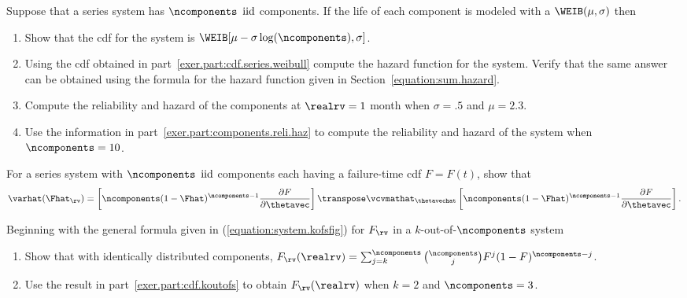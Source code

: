 \begin{exercise1}
Suppose that a series system has $\ncomponents$
$\rm{iid}$ components. If the life of each component
is modeled with a $\WEIB(\mu, \sigma)$ then
\begin{enumerate}
\item
\label{exer.part:cdf.series.weibull}
Show that the cdf for the
system is $\WEIB[\mu-\sigma \log(\ncomponents), \sigma]$.
\item
Using the cdf obtained in part~\ref{exer.part:cdf.series.weibull}
compute the hazard function for the system. Verify that
the same answer can be obtained using the formula 
for the hazard function given in Section~\ref{equation:sum.hazard}.
\item
\label{exer.part:components.reli.haz}
Compute the reliability and hazard of 
the components at $\realrv=1$ month when $\sigma=.5$ and
$\mu=2.3$. 
\item
Use the information in part~\ref{exer.part:components.reli.haz}
to compute the
reliability and hazard of the system when $\ncomponents=10$.
\end{enumerate}
\end{exercise1}

\begin{exercise1}
For a series system with 
$\ncomponents$ ${\rm iid}$ components each having
a failure-time cdf $F=F(t)$, show that
\begin{displaymath}
\varhat(\Fhat_{\rv}) =
	\left [\ncomponents (1-\Fhat)^{\ncomponents-1}\frac{\partial F}{\partial \thetavec }
 	\right ] \transpose
 	\vcvmathat_{\thetavechat}
        \left [
\ncomponents (1-\Fhat)^{\ncomponents-1}\frac{\partial F}
{\partial \thetavec }	
        \right ].
\end{displaymath}
\end{exercise1}
\begin{exercise1}
Beginning with the general formula given 
in (\ref{equation:system.kofsfig}) for 
$F_{\rv}$ in a $k$-out-of-$\ncomponents$ system
\begin{enumerate}
\item
\label{exer.part:cdf.koutofs}
Show that with identically distributed components,
$F_{\rv}(\realrv)=\sum_{j=k}^{\ncomponents} {\ncomponents \choose j}
F^{j}(1-F)^{\ncomponents-j}$.
\item
Use the result in part~\ref{exer.part:cdf.koutofs} to 
obtain $F_{\rv}(\realrv)$ when $k=2$ and $\ncomponents=3$.
\end{enumerate}
\end{exercise1}
